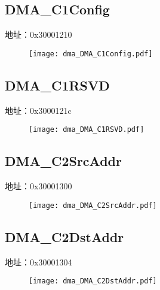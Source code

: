 \subsection{DMA\_C1Config}
\label{dma-DMA-C1Config}
地址：0x30001210
 \begin{figure}[H]
\texttt{[image: dma\_DMA\_C1Config.pdf]}
\end{figure}

\subsection{DMA\_C1RSVD}
\label{dma-DMA-C1RSVD}
地址：0x3000121c
 \begin{figure}[H]
\texttt{[image: dma\_DMA\_C1RSVD.pdf]}
\end{figure}

\subsection{DMA\_C2SrcAddr}
\label{dma-DMA-C2SrcAddr}
地址：0x30001300
 \begin{figure}[H]
\texttt{[image: dma\_DMA\_C2SrcAddr.pdf]}
\end{figure}

\subsection{DMA\_C2DstAddr}
\label{dma-DMA-C2DstAddr}
地址：0x30001304
 \begin{figure}[H]
\texttt{[image: dma\_DMA\_C2DstAddr.pdf]}
\end{figure}

